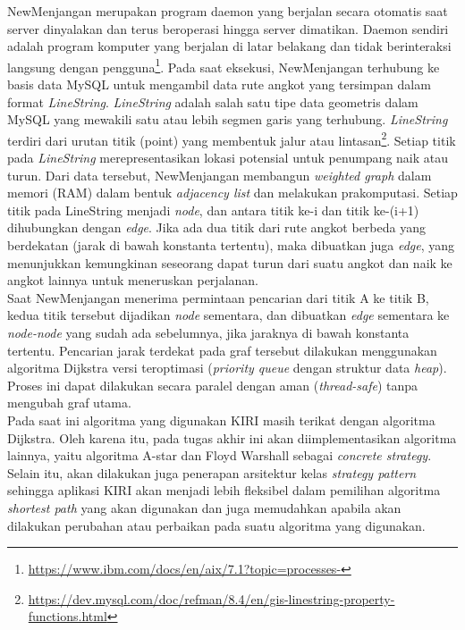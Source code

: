 NewMenjangan merupakan program daemon yang berjalan secara otomatis saat server dinyalakan dan terus beroperasi hingga server dimatikan. Daemon sendiri adalah program komputer yang berjalan di latar belakang dan tidak berinteraksi langsung dengan pengguna\footnote{\url{https://www.ibm.com/docs/en/aix/7.1?topic=processes-}}. Pada saat eksekusi, NewMenjangan terhubung ke basis data MySQL untuk mengambil data rute angkot yang tersimpan dalam format \textit{LineString}. \textit{LineString} adalah salah satu tipe data geometris dalam MySQL yang mewakili satu atau lebih segmen garis yang terhubung. \textit{LineString} terdiri dari urutan titik (point) yang membentuk jalur atau lintasan\footnote{\url{https://dev.mysql.com/doc/refman/8.4/en/gis-linestring-property-functions.html}}. Setiap titik pada \textit{LineString} merepresentasikan lokasi potensial untuk penumpang naik atau turun. Dari data tersebut, NewMenjangan membangun \textit{weighted graph} dalam memori (RAM) dalam bentuk \textit{adjacency list} dan melakukan prakomputasi. Setiap titik pada LineString menjadi \textit{node}, dan antara titik ke-i dan titik ke-(i+1) dihubungkan dengan \textit{edge}. Jika ada dua titik dari rute angkot berbeda yang berdekatan (jarak di bawah konstanta tertentu), maka dibuatkan juga \textit{edge}, yang menunjukkan kemungkinan seseorang dapat turun dari suatu angkot dan naik ke angkot lainnya untuk meneruskan perjalanan. 
\\
Saat NewMenjangan menerima permintaan pencarian dari titik A ke titik B, kedua titik tersebut dijadikan \textit{node} sementara, dan dibuatkan \textit{edge} sementara ke \textit{node-node} yang sudah ada sebelumnya, jika jaraknya di bawah konstanta tertentu. Pencarian jarak terdekat pada graf tersebut dilakukan menggunakan algoritma Dijkstra versi teroptimasi (\textit{priority queue} dengan struktur data \textit{heap}). Proses ini dapat dilakukan secara paralel dengan aman (\textit{thread-safe}) tanpa mengubah graf utama.
\\
Pada saat ini algoritma yang digunakan KIRI masih terikat dengan algoritma Dijkstra. Oleh karena itu, pada tugas akhir ini akan diimplementasikan algoritma lainnya, yaitu algoritma A-star dan Floyd Warshall sebagai \textit{concrete strategy}. Selain itu, akan dilakukan juga penerapan arsitektur kelas \textit{strategy pattern} sehingga aplikasi KIRI akan menjadi lebih fleksibel dalam pemilihan algoritma \textit{shortest path} yang akan digunakan dan juga memudahkan apabila akan dilakukan perubahan atau perbaikan pada suatu algoritma yang digunakan.

